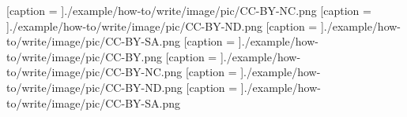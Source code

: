 \begin{enumerate}
{    %
    {[caption = { }]{./example/how-to/write/image/pic/CC-BY-NC.png}}%
    {[caption = { }]{./example/how-to/write/image/pic/CC-BY-ND.png}}%
    {[caption = { }]{./example/how-to/write/image/pic/CC-BY-SA.png}}%
    {[caption = { }]{./example/how-to/write/image/pic/CC-BY.png}}%
    {[caption = { }]{./example/how-to/write/image/pic/CC-BY-NC.png}}%
    {[caption = { }]{./example/how-to/write/image/pic/CC-BY-ND.png}}%
    {[caption = { }]{./example/how-to/write/image/pic/CC-BY-SA.png}}
  } %
  \end{enumerate}

\EndChapter
